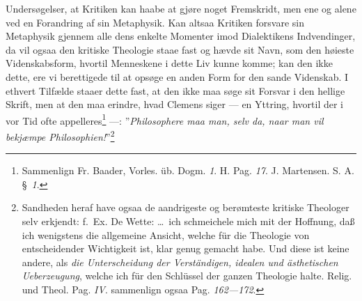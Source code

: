 \documentclass[12pt]{book}
\begin{document}
Undersøgelser, at Kritiken kan haabe at gjøre noget Fremskridt, men ene og
alene ved en Forandring af sin Metaphysik. Kan altsaa Kritiken forsvare sin
Metaphysik gjennem alle dens enkelte Momenter imod Dialektikens Indvendinger,
da vil ogsaa den kritiske Theologie staae fast og hævde sit Navn, som den
høieste Videnskabsform, hvortil Menneskene i dette Liv kunne komme; kan den
ikke dette, ere vi berettigede til at opsøge en anden Form for den sande
Videnskab. I ethvert Tilfælde staaer dette fast, at den ikke maa søge sit
Forsvar i den hellige Skrift, men at den maa erindre, hvad Clemens siger ---
en Yttring, hvortil der i vor Tid ofte appelleres\footnote{Sammenlign Fr.
Baader, Vorles. üb. Dogm. \textit{1}. H. Pag. \textit{17}. J. Martensen. S.
A. §~\textit{1}.} ---: ”\emph{Philosophere maa man, selv da, naar man vil
bekjæmpe Philosophien!}”\footnote{Sandheden heraf have ogsaa de aandrigeste og
berømteste kritiske Theologer selv erkjendt: f.~Ex. De Wette: \ldots\ ich
schmeichele mich mit der Hoffnung, daß ich wenigstens die allgemeine Ansicht,
welche für die Theologie von entscheidender Wichtigkeit ist, klar genug
gemacht habe. Und diese ist keine andere, als \emph{die Unterscheidung der
Verständigen, idealen und ästhetischen Ueberzeugung}, welche ich für den
Schlüssel der ganzen Theologie halte. Relig. und Theol. Pag. \textit{IV}.
sammenlign ogsaa Pag. \textit{162---172}.

}
\end{document}
